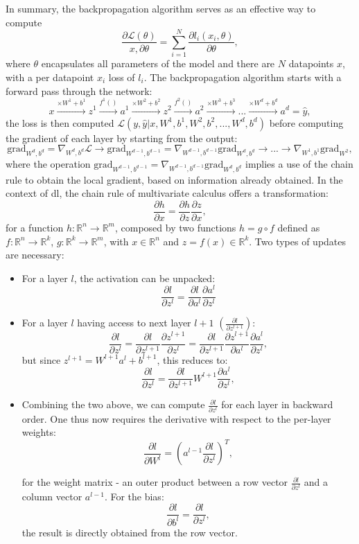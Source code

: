 In summary, the backpropagation algorithm serves as an effective way to compute \[ \frac{\partial\mathcal{L}(\theta)}{x, \partial\theta} = \sum_{i=1}^N \frac{\partial l_i(x_i, \theta)}{\partial\theta},\] 
where $\theta$ encapsulates all parameters of the model and there are $N$ datapoints $x$, with a per datapoint $x_i$ loss of $l_i$. 
The backpropagation algorithm starts with a forward pass through the network: \[ x \xrightarrow{\times W^1 + b^1} z^1 \xrightarrow{f^1()} a^1 \xrightarrow{\times W^2 + b^2} z^2 \xrightarrow{f^2()} a^2 \xrightarrow{\times W^3 + b^3} ... \xrightarrow{\times W^d + b^d} a^d = \hat{y},\] the loss is then computed $\mathcal{L}(y, \hat{y} | x, W^1, b^1, W^2, b^2, ..., W^d, b^d)$ before computing the gradient of each layer by starting from the output:\[\text{grad}_{W^d, b^d} = \nabla_{W^d, b^d} \mathcal{L} \rightarrow \text{grad}_{W^{d-1}, b^{d-1}} = \nabla_{W^{d-1}, b^{d-1}} \text{grad}_{W^d, b^d} \rightarrow ... \rightarrow \nabla_{W^{1}, b^1} \text{grad}_{W^2}, \]
where the operation $\text{grad}_{W^{d-1}, b^{d-1}} = \nabla_{W^{d-1}, b^{d-1}} \text{grad}_{W^d, b^{d}}$ implies a use of the chain rule to obtain the local gradient, based on information already obtained. In the context of \gls{dl}, the chain rule of multivariate calculus offers a transformation:
\begin{equation}
    \frac{\partial h}{\partial x} = \frac{\partial h}{\partial z}\frac{\partial z}{\partial x},
\end{equation}
for a function $h: \mathbb{R}^n \rightarrow \mathbb{R}^m$, composed by two functions $h = g \circ f$ defined as $f: \mathbb{R}^n \rightarrow \mathbb{R}^k$, $g: \mathbb{R}^k \rightarrow \mathbb{R}^m$, with $x \in \mathbb{R}^n$ and $z = f(x) \in \mathbb{R}^k$. Two types of updates are necessary: 
\begin{itemize}
    \item For a layer $l$, the activation can be unpacked: \[\frac{\partial l}{\partial z^l} = \frac{\partial l}{\partial a^l} \frac{\partial a^l}{\partial z^l}\]
    \item For a layer $l$ having access to next layer $l+1$ $(\frac{\partial l}{\partial z^{l+1}})$: \[\frac{\partial l}{\partial z^l} = \frac{\partial l}{\partial z^{l+1}} \frac{\partial z^{l+1}}{\partial z^l} = \frac{\partial l}{\partial z^{l+1}} \frac{\partial z^{l+1}}{\partial a^l} \frac{\partial a^l}{\partial z^l}, \] but since $z^{l+1} = W^{l+1}a^l + b^{l+1}$, this reduces to:\[\frac{\partial l}{\partial z^l} = \frac{\partial l}{\partial z^{l+1}} W^{l+1} \frac{\partial a^l}{\partial z^l}, \]

    \item Combining the two above, we can compute $\frac{\partial l}{\partial z^l}$ for each layer in backward order. One thus now requires the derivative with respect to the per-layer weights: \[\frac{\partial l}{\partial W^l} = (a^{l-1} \frac{\partial l}{\partial z^l})^T,\] 
    
    for the weight matrix - an outer product between a row vector $\frac{\partial l}{\partial z^l}$ and a column vector $a^{l-1}$. For the bias: \[\frac{\partial l}{\partial b^l} = \frac{\partial l}{\partial z^l},\] the result is directly obtained from the row vector. 
\end{itemize}

